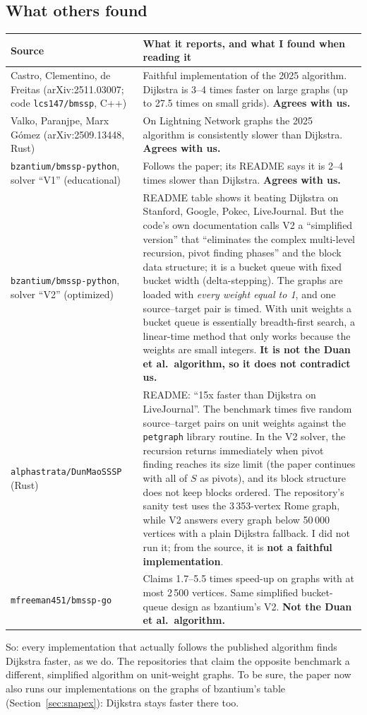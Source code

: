 \documentclass[11pt,a4paper]{article}
\newcommand{\code}[1]{\texttt{#1}}
\begin{document}
\subsection{What others found}
\begin{longtable}{@{}p{4.1cm}p{11.1cm}@{}}
\toprule
Source & What it reports, and what I found when reading it\\
\midrule
Castro, Clementino, de Freitas (arXiv:2511.03007; code \code{lcs147/bmssp}, C++) & Faithful implementation of the 2025 algorithm. Dijkstra is 3--4 times faster on large graphs (up to 27.5 times on small grids). \textbf{Agrees with us.}\\
Valko, Paranjpe, Marx G\'omez (arXiv:2509.13448, Rust) & On Lightning Network graphs the 2025 algorithm is consistently slower than Dijkstra. \textbf{Agrees with us.}\\
\code{bzantium/bmssp-python}, solver ``V1'' (educational) & Follows the paper; its README says it is 2--4 times slower than Dijkstra. \textbf{Agrees with us.}\\
\code{bzantium/bmssp-python}, solver ``V2'' (optimized) & README table shows it beating Dijkstra on Stanford, Google, Pokec, LiveJournal. But the code's own documentation calls V2 a ``simplified version'' that ``eliminates the complex multi-level recursion, pivot finding phases'' and the block data structure; it is a bucket queue with fixed bucket width (delta-stepping). The graphs are loaded with \emph{every weight equal to 1}, and one source--target pair is timed. With unit weights a bucket queue is essentially breadth-first search, a linear-time method that only works because the weights are small integers. \textbf{It is not the Duan et al.\ algorithm, so it does not contradict us.}\\
\code{alphastrata/DunMaoSSSP} (Rust) & README: ``15x faster than Dijkstra on LiveJournal''. The benchmark times five random source--target pairs on unit weights against the \code{petgraph} library routine. In the V2 solver, the recursion returns immediately when pivot finding reaches its size limit (the paper continues with all of $S$ as pivots), and its block structure does not keep blocks ordered. The repository's sanity test uses the 3\,353-vertex Rome graph, while V2 answers every graph below 50\,000 vertices with a plain Dijkstra fallback. I did not run it; from the source, it is \textbf{not a faithful implementation}.\\
\code{mfreeman451/bmssp-go} & Claims 1.7--5.5 times speed-up on graphs with at most 2\,500 vertices. Same simplified bucket-queue design as bzantium's V2. \textbf{Not the Duan et al.\ algorithm.}\\
\bottomrule
\end{longtable}
So: every implementation that actually follows the published algorithm finds Dijkstra faster, as we do. The repositories that claim the opposite benchmark a different, simplified algorithm on unit-weight graphs. To be sure, the paper now also runs our implementations on the graphs of bzantium's table (Section~\ref{sec:snapex}): Dijkstra stays faster there too.
\end{document}
